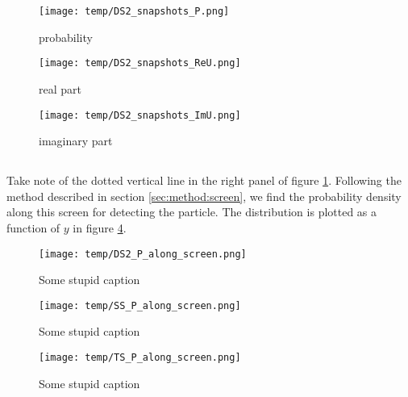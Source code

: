     \begin{figure*}
        \centering
        \begin{subfigure}{0.92\textwidth}
            \texttt{[image: temp/DS2\_snapshots\_P.png]}
            \caption{probability}
            \label{fig:snapshots_p_DS2}
        \end{subfigure}
        \hfill
        \begin{subfigure}{0.92\textwidth}
            \texttt{[image: temp/DS2\_snapshots\_ReU.png]}
            \caption{real part}
            \label{fig:snapshots_ReU_DS2}
        \end{subfigure}
        \hfill
        \begin{subfigure}{0.92\textwidth}
            \texttt{[image: temp/DS2\_snapshots\_ImU.png]}
            \caption{imaginary part}
            \label{fig:snapshots_ImU_DS2}
        \end{subfigure}
        \caption{Colour maps showing }
        \label{fig:snapshots_DS2}
    \end{figure*}




\subsection{}

    Take note of the dotted vertical line in the right panel of figure \ref{fig:snapshots_p_DS2}. Following the method described in section \ref{sec:method:screen}, we find the probability density along this screen for detecting the particle.  The distribution is plotted as a function of $y$ in figure \ref{fig:p_along_y_DS2}.



    \begin{figure}[ht!]
        \centering
        \texttt{[image: temp/DS2\_P\_along\_screen.png]}
        \caption{Some stupid caption}
        \label{fig:p_along_y_DS2}
    \end{figure}

    \begin{figure}[ht!]
        \centering
        \texttt{[image: temp/SS\_P\_along\_screen.png]}
        \caption{Some stupid caption}
        \label{fig:p_along_y_SS}
    \end{figure}

    \begin{figure}[ht!]
        \centering
        \texttt{[image: temp/TS\_P\_along\_screen.png]}
        \caption{Some stupid caption}
        \label{fig:p_along_y_TS}
    \end{figure}



